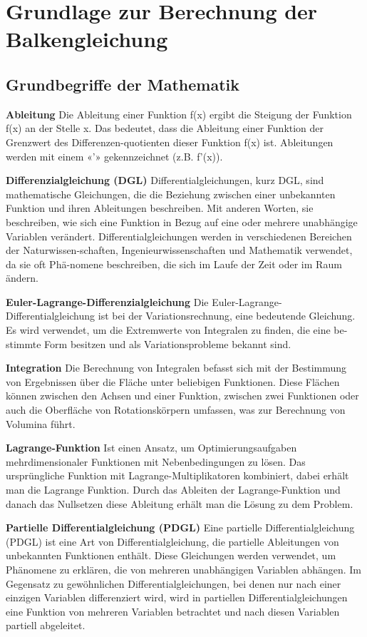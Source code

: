 %
%
%
%
\section{Grundlage zur Berechnung der Balkengleichung
\label{balken:section:teil1}}
\subsection{Grundbegriffe der Mathematik}
\textbf{Ableitung}
Die Ableitung einer Funktion f(x) ergibt die Steigung der Funktion f(x) an der Stelle x.
Das bedeutet, dass die Ableitung einer Funktion der Grenzwert des Differenzen-quotienten dieser Funktion f(x) ist.
Ableitungen werden mit einem «’» gekennzeichnet (z.B. f’(x)).

\textbf{Differenzialgleichung (DGL)}
Differentialgleichungen, kurz DGL, sind mathematische Gleichungen, die die Beziehung zwischen einer unbekannten Funktion und ihren Ableitungen beschreiben.
Mit anderen Worten, sie beschreiben, wie sich eine Funktion in Bezug auf eine oder mehrere unabhängige Variablen verändert.
Differentialgleichungen werden in verschiedenen Bereichen der Naturwissen-schaften, Ingenieurwissenschaften und Mathematik verwendet, da sie oft Phä-nomene beschreiben, die sich im Laufe der Zeit oder im Raum ändern.

\textbf{Euler-Lagrange-Differenzialgleichung}
Die Euler-Lagrange-Differentialgleichung ist bei der Variationsrechnung, eine bedeutende Gleichung.
Es wird verwendet, um die Extremwerte von Integralen zu finden, die eine be-stimmte Form besitzen und als Variationsprobleme bekannt sind.

\textbf{Integration}
Die Berechnung von Integralen befasst sich mit der Bestimmung von Ergebnissen über die Fläche unter beliebigen Funktionen.
Diese Flächen können zwischen den Achsen und einer Funktion, zwischen zwei Funktionen oder auch die Oberfläche von Rotationskörpern umfassen, was zur Berechnung von Volumina führt.

\textbf{Lagrange-Funktion}
Ist einen Ansatz, um Optimierungsaufgaben mehrdimensionaler Funktionen mit Nebenbedingungen zu lösen.
Das ursprüngliche Funktion mit Lagrange-Multiplikatoren kombiniert, dabei erhält man die Lagrange Funktion.
Durch das Ableiten der Lagrange-Funktion und danach das Nullsetzen diese Ableitung erhält man die Lösung zu dem Problem.

\textbf{Partielle Differentialgleichung (PDGL)}
Eine partielle Differentialgleichung (PDGL) ist eine Art von Differentialgleichung, die partielle Ableitungen von unbekannten Funktionen enthält.
Diese Gleichungen werden verwendet, um Phänomene zu erklären, die von mehreren unabhängigen Variablen abhängen.
Im Gegensatz zu gewöhnlichen Differentialgleichungen, bei denen nur nach einer einzigen Variablen differenziert wird, wird in partiellen Differentialgleichungen eine Funktion von mehreren Variablen betrachtet und nach diesen Variablen partiell abgeleitet.

